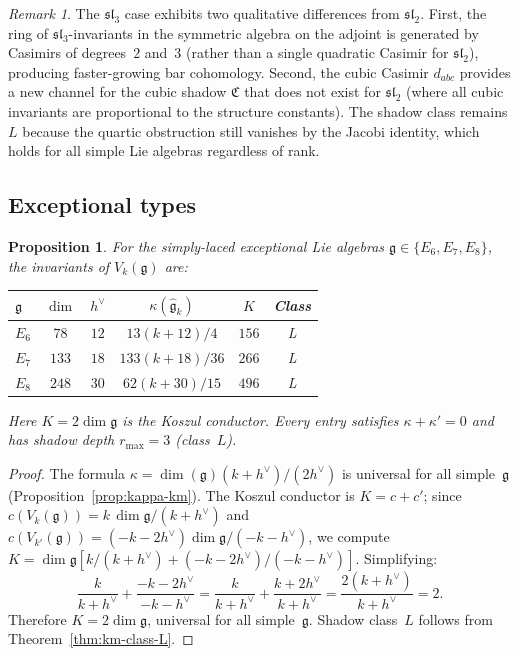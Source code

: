 \documentclass[11pt]{article}
\theoremstyle{plain}
\newtheorem{proposition}[theorem]{Proposition}
\theoremstyle{definition}
\theoremstyle{remark}
\newtheorem{remark}[theorem]{Remark}
\newcommand{\fg}{\mathfrak{g}}
\newcommand{\fsl}{\mathfrak{sl}}
\newcommand{\ghat}{\widehat{\fg}}
\numberwithin{equation}{section}
\begin{document}
\begin{remark}\label{rem:sl3-vs-sl2}
The $\fsl_3$ case exhibits two qualitative differences
from $\fsl_2$.
First, the ring of $\fsl_3$-invariants in the symmetric
algebra on the adjoint is generated by Casimirs of
degrees~$2$ and~$3$ (rather than a single quadratic
Casimir for $\fsl_2$), producing faster-growing bar
cohomology.
Second, the cubic Casimir $d_{abc}$ provides a new
channel for the cubic shadow $\mathfrak{C}$ that does
not exist for $\fsl_2$ (where all cubic invariants
are proportional to the structure constants).
The shadow class remains $L$ because the quartic
obstruction still vanishes by the Jacobi identity,
which holds for all simple Lie algebras regardless
of rank.
\end{remark}

\subsection{Exceptional types}

\begin{proposition}\label{prop:exceptional}
For the simply-laced exceptional Lie algebras
$\fg \in \{E_6, E_7, E_8\}$, the invariants of
$V_k(\fg)$ are:
\begin{center}
\renewcommand{\arraystretch}{1.3}
\begin{tabular}{lccccc}
\toprule
$\fg$ & $\dim$ & $h^\vee$ & $\kappa(\ghat_k)$
 & $K$ & Class \\
\midrule
$E_6$ & $78$ & $12$ & $13(k{+}12)/4$ & $156$ & L \\
$E_7$ & $133$ & $18$ & $133(k{+}18)/36$ & $266$ & L \\
$E_8$ & $248$ & $30$ & $62(k{+}30)/15$ & $496$ & L \\
\bottomrule
\end{tabular}
\end{center}
Here $K = 2\dim\fg$ is the Koszul conductor.
Every entry satisfies $\kappa + \kappa' = 0$ and has
shadow depth $r_{\max} = 3$ \textup{(}class~$L$\textup{)}.
\end{proposition}

\begin{proof}
The formula $\kappa = \dim(\fg)(k{+}h^\vee)/(2h^\vee)$
is universal for all simple~$\fg$
(Proposition~\ref{prop:kappa-km}).
The Koszul conductor is $K = c + c'$; since
$c(V_k(\fg)) = k\,\dim\fg/(k{+}h^\vee)$ and
$c(V_{k'}(\fg)) = (-k{-}2h^\vee)\dim\fg/(-k{-}h^\vee)$,
we compute $K = \dim\fg[k/(k{+}h^\vee)
+ (-k{-}2h^\vee)/(-k{-}h^\vee)]$.
Simplifying:
\[
\frac{k}{k{+}h^\vee}
+ \frac{-k{-}2h^\vee}{-k{-}h^\vee}
= \frac{k}{k{+}h^\vee}
+ \frac{k{+}2h^\vee}{k{+}h^\vee}
= \frac{2(k{+}h^\vee)}{k{+}h^\vee} = 2.
\]
Therefore $K = 2\dim\fg$, universal for all simple~$\fg$.
Shadow class~$L$ follows from
Theorem~\ref{thm:km-class-L}.
\end{proof}
\end{document}
